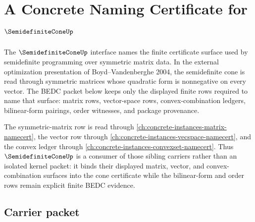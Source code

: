 \chapter{A Concrete Naming Certificate for $\SemidefiniteConeUp$}
\label{ch:concrete-instances-semidefinitecone-namecert}

The $\SemidefiniteConeUp$ interface names the finite certificate surface used by semidefinite programming over symmetric matrix data. In the external optimization presentation of Boyd--Vandenberghe 2004, the semidefinite cone is read through symmetric matrices whose quadratic form is nonnegative on every vector. The BEDC packet below keeps only the displayed finite rows required to name that surface: matrix rows, vector-space rows, convex-combination ledgers, bilinear-form pairings, order witnesses, and package provenance.

The symmetric-matrix row is read through \autoref{ch:concrete-instances-matrix-namecert}, the vector row through \autoref{ch:concrete-instances-vecspace-namecert}, and the convex ledger through \autoref{ch:concrete-instances-convexset-namecert}. Thus $\SemidefiniteConeUp$ is a consumer of those sibling carriers rather than an isolated kernel packet: it binds their displayed matrix, vector, and convex-combination surfaces into the cone certificate while the bilinear-form and order rows remain explicit finite BEDC evidence.

\section{Carrier packet}
\label{sec:semidefinitecone-carrier-packet}

